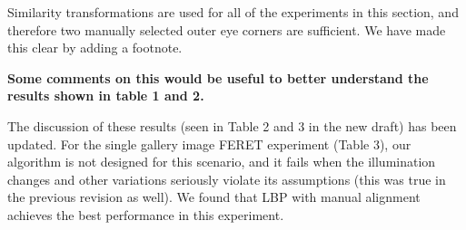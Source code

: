 \documentclass[11pt]{article}
\begin{document}
Similarity transformations are used for all of the experiments in this section, and
therefore two manually selected outer eye corners are sufficient.  We have
made this clear by adding a footnote.

{\bf
	Some comments on this would be useful to better understand the results shown in table 1 and 2.
}

The discussion of these results (seen in Table 2 and 3 in the new
draft) has been updated. For the single gallery image FERET
experiment (Table 3), our algorithm is not designed for
this scenario, and it fails when the illumination changes and other
variations seriously violate its assumptions (this was true in the previous
revision as well). We found that LBP
with manual alignment achieves the best performance in this
experiment.
\end{document}
